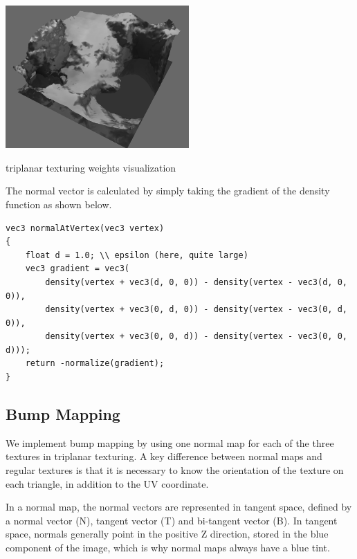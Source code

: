 \documentclass {article}
\begin{document}
\begin{center}
    \includegraphics[width=7cm]{triplanar.png}

    triplanar texturing weights visualization
\end{center}

The normal vector is calculated by simply taking the gradient of the density function as shown below.

\begin{lstlisting}
vec3 normalAtVertex(vec3 vertex)
{
    float d = 1.0; \\ epsilon (here, quite large)
    vec3 gradient = vec3(
        density(vertex + vec3(d, 0, 0)) - density(vertex - vec3(d, 0, 0)),
        density(vertex + vec3(0, d, 0)) - density(vertex - vec3(0, d, 0)),
        density(vertex + vec3(0, 0, d)) - density(vertex - vec3(0, 0, d)));
    return -normalize(gradient);
}
\end{lstlisting}

\subsection{Bump Mapping}

We implement bump mapping by using one normal map for each of the three textures in triplanar texturing. A key difference between normal maps and regular textures is that it is necessary to know the orientation of the texture on each triangle, in addition to the UV coordinate.

In a normal map, the normal vectors are represented in tangent space, defined by a normal vector (N), tangent vector (T) and bi-tangent vector (B). In tangent space, normals generally point in the positive Z direction, stored in the blue component of the image, which is why normal maps always have a blue tint.
\end{document}
